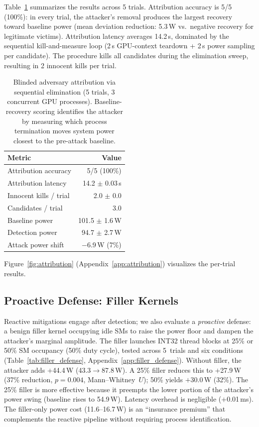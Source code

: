 \documentclass[letterpaper,twocolumn,10pt]{article}
\begin{document}
Table~\ref{tab:blinded_attribution} summarizes the results across
5 trials.  Attribution accuracy is 5/5 (100\%): in every trial,
the attacker's removal produces the largest recovery toward
baseline power (mean deviation reduction: 5.3\,W vs.\ negative
recovery for legitimate victims).  Attribution latency averages
14.2\,s, dominated by the sequential kill-and-measure loop
(2\,s GPU-context teardown + 2\,s power sampling per candidate).
The procedure kills all candidates during the elimination sweep,
resulting in 2 innocent kills per trial.

\begin{table}[t]
\centering\small
\caption{Blinded adversary attribution via sequential elimination
  (5 trials, 3 concurrent GPU processes).  Baseline-recovery scoring
  identifies the attacker by measuring which process termination
  moves system power closest to the pre-attack baseline.}
\label{tab:blinded_attribution}
\begin{tabular}{lr}
\toprule
Metric & Value \\
\midrule
Attribution accuracy & 5/5 (100\%) \\
Attribution latency & 14.2 $\pm$ 0.03\,s \\
Innocent kills / trial & 2.0 $\pm$ 0.0 \\
Candidates / trial & 3.0 \\
Baseline power & 101.5 $\pm$ 1.6\,W \\
Detection power & 94.7 $\pm$ 2.7\,W \\
Attack power shift & $-$6.9\,W (7\%) \\
\bottomrule
\end{tabular}
\end{table}

Figure~\ref{fig:attribution}
(Appendix~\ref{app:attribution}) visualizes the per-trial results.

\subsection{Proactive Defense: Filler Kernels}
\label{sec:mit-filler}

Reactive mitigations engage after detection; we also evaluate a
\emph{proactive} defense: a benign filler kernel occupying idle SMs
to raise the power floor and dampen the attacker's marginal amplitude.
The filler launches INT32 thread blocks at 25\% or 50\% SM occupancy
(50\% duty cycle), tested across 5~trials and six conditions
(Table~\ref{tab:filler_defense},
Appendix~\ref{app:filler_defense}).
Without filler, the attacker adds $+$44.4\,W (43.3$\to$87.8\,W).
A 25\% filler reduces this to $+$27.9\,W (37\% reduction,
$p{=}0.004$, Mann--Whitney~$U$); 50\% yields $+$30.0\,W (32\%).
The 25\% filler is more effective because it preempts the lower
portion of the attacker's power swing (baseline rises to 54.9\,W).
Latency overhead is negligible ($+$0.01\,ms).
The filler-only power cost (11.6--16.7\,W) is an ``insurance
premium'' that complements the reactive pipeline without
requiring process identification.
\end{document}
